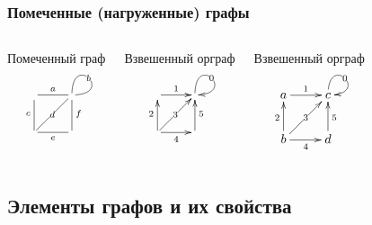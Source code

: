 \begin{frame}
    \frametitle{Помеченные (нагруженные) графы}

    \begin{columns}
            \begin{block}{Помеченный граф}
                \[
                    {\xymatrix{
                        \ar@{-}[r]^{a}
                            &\ar@{-}@(u,r)[]|-{b}
                                \\
                        \ar@{-}[u]^{c} \ar@{-}[ur]|-{d} \ar@{-}[r]_{e}
                            &\ar@{-}[u]_{f}
                    }}
                \]
            \end{block}
            \begin{block}{Взвешенный орграф}
                \[
                    {\xymatrix{
                        \ar@{->}[r]^{1}
                            &\ar@{->}@(u,r)[]|-{0}
                                \\
                        \ar@{->}[u]^{2} \ar@{->}[ur]|-{3} \ar@{->}[r]_{4}
                            &\ar@{->}[u]_{5}
                    }}
                \]
            \end{block}
            \begin{block}{Взвешенный орграф}
                \[
                    {\xymatrix{
                        a \ar@{->}[r]^{1}
                            &c \ar@{->}@(u,r)[]|-{0}
                                \\
                        b \ar@{->}[u]^{2} \ar@{->}[ur]|-{3} \ar@{->}[r]_{4}
                            &d \ar@{->}[u]_{5}
                    }}
                \]
            \end{block}
    \end{columns}
\end{frame}


\subsection{Элементы графов и их свойства}

